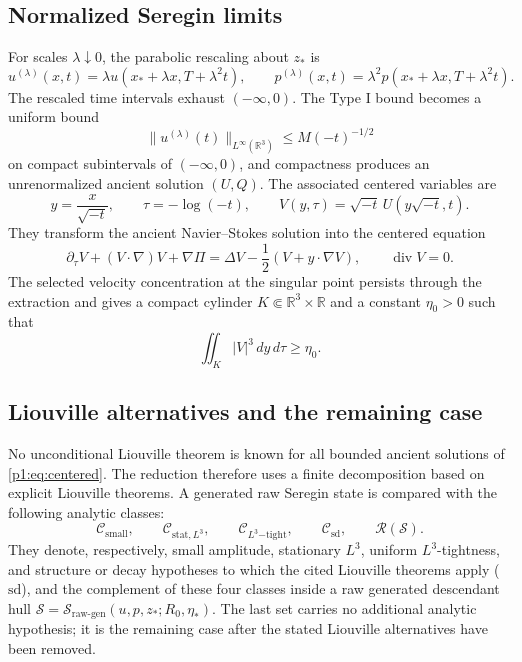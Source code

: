 \documentclass[11pt]{amsart}
\theoremstyle{plain}
\theoremstyle{definition}
\theoremstyle{remark}
\numberwithin{equation}{section}
\newcommand{\R}{\mathbb R}
\newcommand{\divergence}{\operatorname{div}}
\newcommand{\calS}{\mathcal S}
\newcommand{\calR}{\mathcal R}
\newcommand{\calC}{\mathcal C}
\begin{document}
\subsection{Normalized Seregin limits}

For scales \(\lambda\downarrow0\), the parabolic rescaling about \(z_*\) is
\[
   u^{(\lambda)}(x,t)
   =
   \lambda u(x_*+\lambda x,T+\lambda^2t),\qquad
   p^{(\lambda)}(x,t)
   =
   \lambda^2p(x_*+\lambda x,T+\lambda^2t).
\]
The rescaled time intervals exhaust \((-\infty,0)\).  The Type I bound
becomes a uniform bound
\[
   \|u^{(\lambda)}(t)\|_{L^\infty(\R^3)}
   \le M(-t)^{-1/2}
\]
on compact subintervals of \((-\infty,0)\), and compactness produces an
unrenormalized ancient solution \((U,Q)\).  The associated centered variables
are
\[
   y=\frac{x}{\sqrt{-t}},\qquad
   \tau=-\log(-t),\qquad
   V(y,\tau)=\sqrt{-t}\,U(y\sqrt{-t},t).
\]
They transform the ancient Navier--Stokes solution into the centered equation
\begin{equation}\label{p1:eq:centered}
   \partial_\tau V+(V\cdot\nabla)V+\nabla\Pi
   =
   \Delta V-\frac12(V+y\cdot\nabla V),
   \qquad \divergence V=0.
\end{equation}
The selected velocity concentration at the singular point persists through
the extraction and gives a compact cylinder \(K\Subset\R^3\times\R\) and a
constant \(\eta_0>0\) such that
\begin{equation}\label{p1:eq:nonvanishing}
   \iint_K |V|^3\,dy\,d\tau\ge\eta_0 .
\end{equation}

\subsection{Liouville alternatives and the remaining case}

No unconditional Liouville theorem is known for all bounded ancient solutions
of \eqref{p1:eq:centered}.  The reduction therefore uses a finite decomposition
based on explicit Liouville theorems.  A generated raw Seregin state is compared with the
following analytic classes:
\[
   \calC_{\mathrm{small}},\qquad
   \calC_{\mathrm{stat},L^3},\qquad
   \calC_{L^3\mathrm{-tight}},\qquad
   \calC_{\mathrm{sd}},\qquad
   \calR(\calS).
\]
They denote, respectively, small amplitude, stationary \(L^3\), uniform
\(L^3\)-tightness, and structure or decay hypotheses to which the cited
Liouville theorems apply
(\(\mathrm{sd}\)), and the complement of these four classes inside a raw
generated descendant hull
\(\calS=\calS_{\mathrm{raw\text{-}gen}}(u,p,z_*;R_0,\eta_*)\).  The last set carries no additional
analytic hypothesis; it is the remaining case after the stated Liouville
alternatives have been removed.
\end{document}
